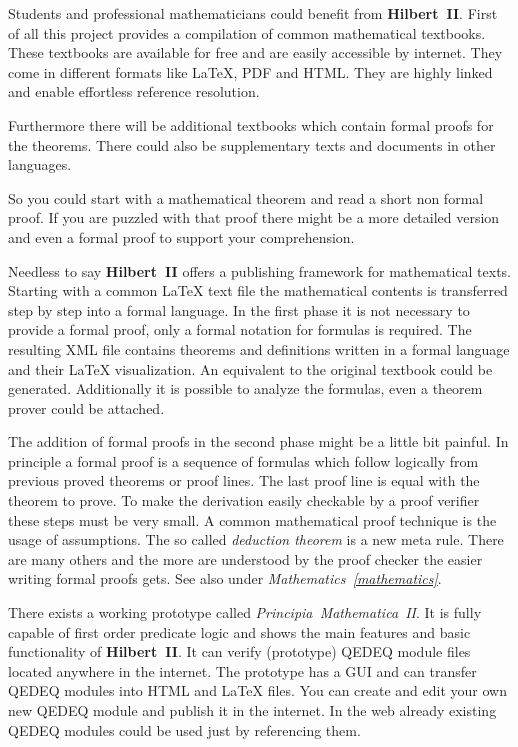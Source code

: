 \documentclass[a4paper,german,10pt,twoside]{book}
\theoremstyle{definition}
\theoremstyle{remark}
\begin{document}
Students and professional mathematicians could benefit from \textbf{Hilbert~II}. First of all this project provides a compilation of common mathematical textbooks. These textbooks are available for free and are easily accessible by internet. They come in different formats like \LaTeX{}, PDF and HTML. They are highly linked and enable effortless reference resolution.

\par
Furthermore there will be additional textbooks which contain formal proofs for the theorems. There could also be supplementary texts and documents in other languages. 

\par
So you could start with a mathematical theorem and read a short non formal proof. If you are puzzled with that proof there might be a more detailed version and even a formal proof to support your comprehension.

\par
Needless to say \textbf{Hilbert~II} offers a publishing framework for mathematical texts. Starting with a common \LaTeX{} text file the mathematical contents is transferred step by step into a formal language. In the first phase it is not necessary to provide a formal proof, only a formal notation for formulas is required. The resulting XML file contains theorems and definitions written in a formal language and their \LaTeX{} visualization. An equivalent to the original textbook could be generated. Additionally it is possible to analyze the formulas, even a theorem prover could be attached.

\par
The addition of formal proofs in the second phase might be a little bit painful. In principle a formal proof is a sequence of formulas which follow logically from previous proved theorems or proof lines. The last proof line is equal with the theorem to prove. To make the derivation easily checkable by a proof verifier these steps must be very small. A common mathematical proof technique is the usage of assumptions. The so called \emph{deduction theorem} is a new meta rule. There are many others and the more are understood by the proof checker the easier writing formal proofs gets. See also under \emph{Mathematics~\ref{mathematics}}.

\par
There exists a working prototype called \emph{Principia~Mathematica~II}. It is fully capable of first order predicate logic and shows the main features and basic functionality of \textbf{Hilbert~II}. It can verify (prototype) QEDEQ module files located anywhere in the internet. The prototype has a GUI and can transfer QEDEQ modules into HTML and \LaTeX{} files. You can create and edit your own new QEDEQ module and publish it in the internet. In the web already existing QEDEQ modules could be used just by referencing them.
\end{document}
